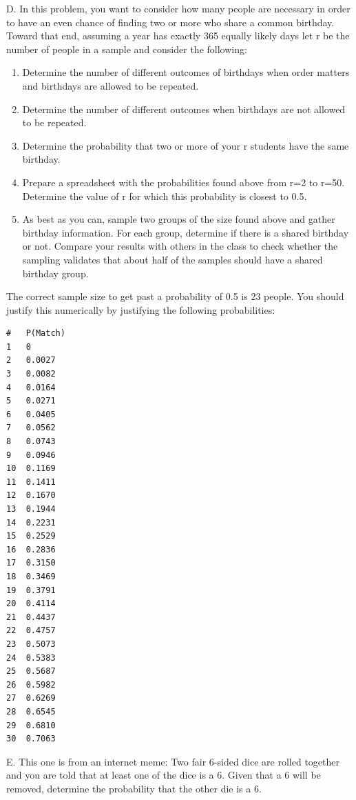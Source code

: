 \documentclass[10pt,]{book}
\theoremstyle{plain}
\theoremstyle{definition}
\theoremstyle{definition}
\theoremstyle{definition}
\numberwithin{equation}{section}
\begin{document}
	D. In this problem, you want to consider how many people are necessary in order to have an even chance of finding two or more who share a common birthday. Toward that end, assuming a year has exactly 365 equally likely days let r be the number of people in a sample and consider the following:
	\leavevmode%
\begin{enumerate}
\item\hypertarget{li-124}{}Determine the number of different outcomes of birthdays when order matters and birthdays are allowed to be repeated.%
\item\hypertarget{li-125}{}Determine the number of different outcomes when birthdays are not allowed to be repeated.%
\item\hypertarget{li-126}{}Determine the probability that two or more of your r students have the same birthday.%
\item\hypertarget{li-127}{}Prepare a spreadsheet with the probabilities found above from r=2 to r=50. Determine the value of r for which this probability is closest to 0.5.%
\item\hypertarget{li-128}{}As best as you can, sample two groups of the size found above and gather birthday information. For each group, determine if there is a shared birthday or not.  Compare your results with others in the class to check whether the sampling validates that about half of the samples should have a shared birthday group.%
\end{enumerate}

	
	
	The correct sample size to get past a probability of 0.5 is 23 people. You should justify this numerically by justifying the following probabilities:
\begin{verbatim}
#	P(Match)	
1	0
2	0.0027
3	0.0082
4	0.0164
5	0.0271
6	0.0405
7	0.0562
8	0.0743
9	0.0946
10	0.1169
11	0.1411
12	0.1670
13	0.1944
14	0.2231
15	0.2529
16	0.2836
17	0.3150
18	0.3469
19	0.3791
20	0.4114
21	0.4437
22	0.4757
23	0.5073
24	0.5383
25	0.5687
26	0.5982
27	0.6269
28	0.6545
29	0.6810
30	0.7063
\end{verbatim}


\par

	E.  This one is from an internet meme:  Two fair 6-sided dice are rolled together and you are told that at least one of the dice is a 6. Given that a 6 will be removed, determine the probability that the other die is a 6.
\end{document}
